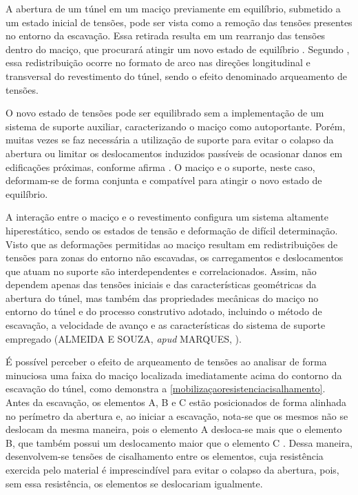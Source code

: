 A abertura de um túnel em um maciço previamente em equilíbrio, submetido a um estado inicial de tensões, pode ser vista como a remoção das tensões presentes no entorno da escavação. Essa retirada resulta em um rearranjo das tensões dentro do maciço, que procurará atingir um novo estado de equilíbrio \cite{Franca2006}. Segundo , essa redistribuição ocorre no formato de arco nas direções longitudinal e transversal do revestimento do túnel, sendo o efeito denominado arqueamento de tensões.

O novo estado de tensões pode ser equilibrado sem a implementação de um sistema de suporte auxiliar, caracterizando o maciço como autoportante. Porém, muitas vezes se faz necessária a utilização de suporte para evitar o colapso da abertura ou limitar os deslocamentos induzidos passíveis de ocasionar danos em edificações próximas, conforme afirma . O maciço e o suporte, neste caso, deformam-se de forma conjunta e compatível para atingir o novo estado de equilíbrio.


A interação entre o maciço e o revestimento configura um sistema altamente hiperestático, sendo os estados de tensão e deformação de difícil determinação. Visto que as deformações permitidas ao maciço resultam em redistribuições de tensões para zonas do entorno não escavadas, os carregamentos e deslocamentos que atuam no suporte são interdependentes e correlacionados. Assim, não dependem apenas das tensões iniciais e das características geométricas da abertura do túnel, mas também das propriedades mecânicas do maciço no entorno do túnel e do processo construtivo adotado, incluindo o método de escavação, a velocidade de avanço e as características do sistema de suporte empregado (ALMEIDA E SOUZA, \citeyear{AlmeidaeSousa1998} \textit{apud} MARQUES, \citeyear{Marques2014}).

É possível perceber o efeito de arqueamento de tensões ao analisar de forma minuciosa uma faixa do maciço localizada imediatamente acima do contorno da escavação do túnel, como demonstra a \autoref{mobilizaçaoresistenciacisalhamento}. Antes da escavação, os elementos A, B e C estão posicionados de forma alinhada no perímetro da abertura e, ao iniciar a escavação, nota-se que os mesmos não se deslocam da mesma maneira, pois o elemento A desloca-se mais que o elemento B, que também possui um deslocamento maior que o elemento C \cite{Franca2006}. Dessa maneira, desenvolvem-se tensões de cisalhamento entre os elementos, cuja resistência exercida pelo material é imprescindível para evitar o colapso da abertura, pois, sem essa resistência, os elementos se deslocariam igualmente.

